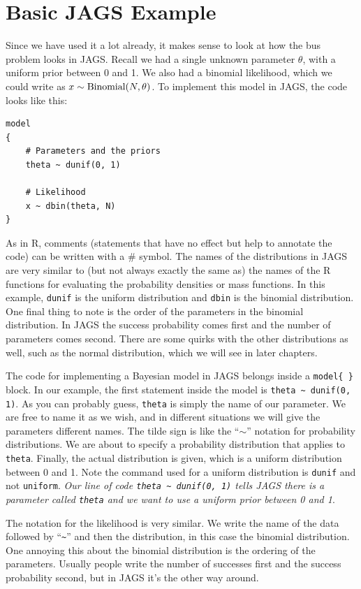 \section{Basic JAGS Example}
Since we have used it a lot already, it makes sense to look at how the bus
problem looks in JAGS. Recall we had a
single unknown parameter $\theta$, with a uniform prior between 0 and 1.
We also had a binomial likelihood, which we could write as
$x \sim \textnormal{Binomial}(N, \theta)$.
To implement this model in JAGS, the code looks like this:
\begin{framed}
\begin{verbatim}
model
{
    # Parameters and the priors
    theta ~ dunif(0, 1)

    # Likelihood
    x ~ dbin(theta, N)
}
\end{verbatim}
\end{framed}
As in R, comments (statements that have no effect but help to annotate the
code) can be written with a \# symbol.
The names of the distributions in JAGS are very similar to (but not always
exactly the same as) the names of the R functions for evaluating the probability
densities or mass functions. In this example, {\tt dunif} is the uniform
distribution and {\tt dbin} is the binomial distribution. One final thing to
note is the order of the parameters in the binomial distribution. In JAGS the
success probability comes first and the number of parameters comes second.
There are some quirks with the other distributions as well, such as the normal
distribution, which we will see in later chapters.

The code for implementing a Bayesian model in JAGS belongs inside
a {\tt model\{   \}} block.
In our example,
the first statement inside the model is {\tt theta \~{ } dunif(0, 1)}. As you
can probably guess, {\tt theta}
is simply the name of our parameter. We are free to name it as we
wish, and in different situations we will give the parameters different names.
The tilde sign is like the ``$\sim$'' notation for probability distributions.
We are
about to specify a probability distribution that applies to {\tt theta}. Finally,
the actual distribution is given, which is a uniform distribution between 0 and 1. Note
the command used for a uniform distribution is {\tt dunif} and not {\tt uniform}.
{\it Our line of code {\tt theta \~{ } dunif(0, 1)}
tells JAGS
there is a parameter called {\tt theta} and we want to use a uniform prior between
0 and 1}.

The notation for the likelihood is very similar. We write the name of the data
followed by ``{\tt \~{ }}'' and then the distribution, in this case the
binomial distribution.
One annoying this about the binomial distribution is the ordering of the parameters.
Usually people write the number of successes first and the success probability
second, but in JAGS it's the other way around.


